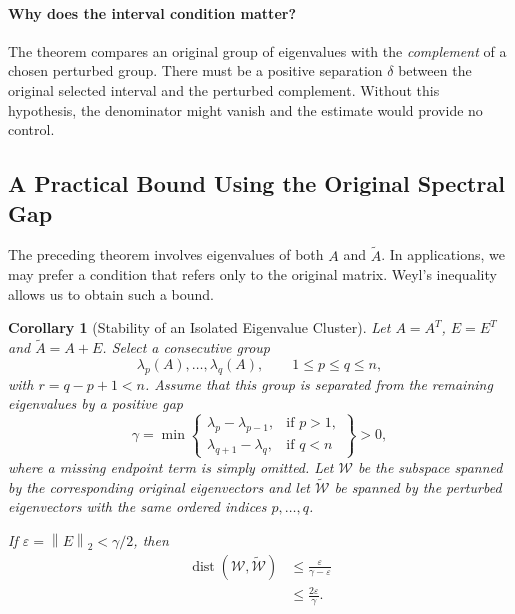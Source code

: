 \documentclass[14pt,letterpaper]{article}
\theoremstyle{plain}
\newtheorem{corollary}[theorem]{Corollary}
\theoremstyle{definition}
\theoremstyle{remark}
\newcommand{\norm}[1]{\left\lVert #1 \right\rVert}
\DeclareMathOperator{\dist}{dist}
\begin{document}
\paragraph{Why does the interval condition matter?}

The theorem compares an original group of eigenvalues
with the \emph{complement} of a chosen perturbed group.
There must be a positive separation $\delta$ between
the original selected interval and the perturbed
complement. Without this hypothesis, the denominator
might vanish and the estimate would provide no control.


\subsection{A Practical Bound Using the Original Spectral Gap}
\label{subsec:dk_population_gap}

The preceding theorem involves eigenvalues of both
$A$ and $\widetilde A$. In applications, we may prefer
a condition that refers only to the original matrix.
Weyl's inequality allows us to obtain such a bound.

\begin{corollary}[Stability of an Isolated Eigenvalue Cluster]
\label{cor:dk_cluster}
Let $A=A^T$, $E=E^T$ and
$\widetilde A=A+E$. Select a consecutive group
\[
\lambda_p(A),\ldots,\lambda_q(A),
\qquad 1\leq p\leq q\leq n,
\]
with $r=q-p+1<n$. Assume that this group is
separated from the remaining eigenvalues by a
positive gap
\[
\boxed{
\gamma=
\min\!\left\{
\begin{array}{ll}
\lambda_p-\lambda_{p-1},&\text{if }p>1,\\
\lambda_{q+1}-\lambda_q,&\text{if }q<n
\end{array}\right\}>0,
}
\]
where a missing endpoint term is simply omitted.
Let $\mathcal W$ be the subspace spanned by the
corresponding original eigenvectors and let
$\widetilde{\mathcal W}$ be spanned by the perturbed
eigenvectors with the same ordered indices $p,\ldots,q$.

If $\varepsilon=\norm{E}_2<\gamma/2$, then
\[
\boxed{
\begin{aligned}
\dist(\mathcal W,\widetilde{\mathcal W})
&\leq\frac{\varepsilon}{\gamma-\varepsilon}\\
&\leq\frac{2\varepsilon}{\gamma}.
\end{aligned}
}
\]
\end{corollary}
\end{document}
